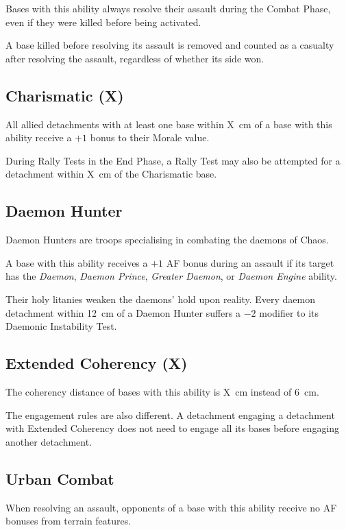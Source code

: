 Bases with this ability always resolve their assault during the Combat Phase, even if they were killed before being activated.

A base killed before resolving its assault is removed and counted as a casualty after resolving the assault, regardless of whether its side won.

\subsection{Charismatic (X)}

All allied detachments with at least one base within X~cm of a base with this ability receive a $+1$ bonus to their Morale value.

During Rally Tests in the End Phase, a Rally Test may also be attempted for a detachment within X~cm of the Charismatic base.

\subsection{Daemon Hunter}

Daemon Hunters are troops specialising in combating the daemons of Chaos.

A base with this ability receives a $+1$ AF bonus during an assault if its target has the \textit{Daemon}, \textit{Daemon Prince}, \textit{Greater Daemon}, or \textit{Daemon Engine} ability.

Their holy litanies weaken the daemons' hold upon reality. Every daemon detachment within 12~cm of a Daemon Hunter suffers a $-2$ modifier to its Daemonic Instability Test.

\subsection{Extended Coherency (X)}

The coherency distance of bases with this ability is X~cm instead of 6~cm.

The engagement rules are also different. A detachment engaging a detachment with Extended Coherency does not need to engage all its bases before engaging another detachment.

\subsection{Urban Combat}

When resolving an assault, opponents of a base with this ability receive no AF bonuses from terrain features.

